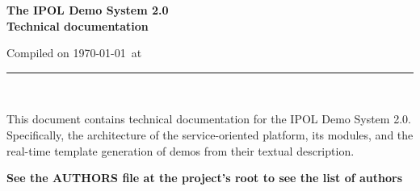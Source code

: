 \documentclass[a4paper,12pt]{article}
\begin{document}
\begin{titlepage}

\begin{center}
\vspace*{-1in}

\vspace*{0.6in}
\begin{Large}
\textbf{The IPOL Demo System 2.0 \\Technical documentation} \\
\end{Large}

\vspace*{0.6in}

\small{Compiled on \today\ at \currenttime}

\vspace*{0.6in}
\rule{80mm}{0.1mm}\\
\vspace*{0.1in}
\end{center}

\end{titlepage}

This document contains technical documentation for the IPOL Demo System 2.0. Specifically, the architecture of the service-oriented platform, its modules, and the real-time template generation of demos from their textual description.
\vspace*{0.6in}


\textbf{See the AUTHORS file at the project's root to see the list of authors}

\newpage

\tableofcontents
\newpage
\listoffigures
\newpage
















\end{document}
